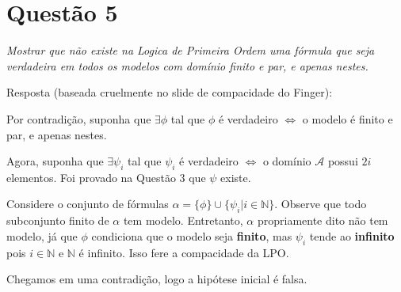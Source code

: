 \documentclass{article}
\begin{document}
\section*{Questão 5}
\textit{Mostrar que não existe na Logica de Primeira Ordem uma fórmula que seja verdadeira em todos os modelos com domínio finito e par, e apenas nestes.}

\medskip
Resposta (baseada cruelmente no slide de compacidade do Finger):

Por contradição, suponha que $\exists \phi$ tal que $\phi$ é verdadeiro $\iff$ o modelo é finito e par, e apenas nestes.

Agora, suponha que $\exists \psi_i$ tal que $\psi_i$ é verdadeiro $\iff$ o domínio $\mathcal{A}$ possui $2i$ elementos. Foi provado na Questão 3 que $\psi$ existe.

Considere o conjunto de fórmulas $\alpha = \{ \phi \} \cup \{ \psi_i \lvert i \in \mathbb{N} \} $. Observe que todo subconjunto finito de $\alpha$ tem modelo. Entretanto, $\alpha$ propriamente dito não tem modelo, já que $\phi$ condiciona que o modelo seja \textbf{finito}, mas $\psi_i$ tende ao \textbf{infinito} pois $i \in \mathbb{N}$ e $\mathbb{N}$ é infinito. Isso fere a compacidade da LPO.

Chegamos em uma contradição, logo a hipótese inicial é falsa.
\end{document}
